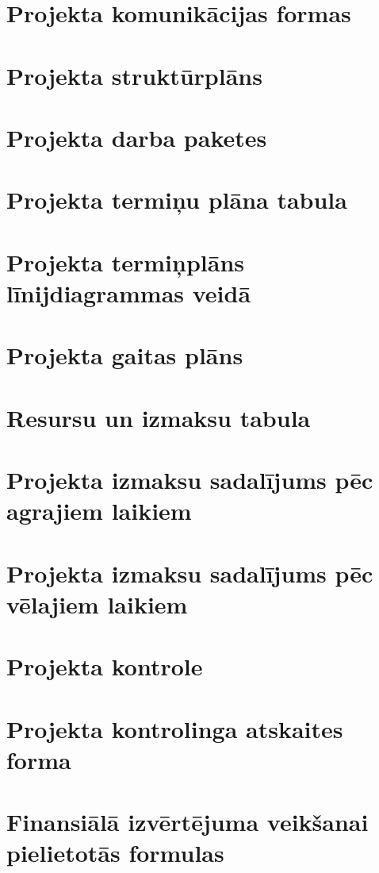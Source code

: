 \section{Projekta komunikācijas formas}
	\label{app:Projekta_komunikacijas_formas}
    \clearpage
\section{Projekta struktūrplāns}
	\label{app:Projekta_strukturplans}
    \clearpage
\section{Projekta darba paketes}
	\label{app:Projekta_darba_paketes}
    \clearpage
\section{Projekta termiņu plāna tabula}
	\label{app:Projekta_terminu_plans}
    \clearpage
\section{Projekta termiņplāns līnijdiagrammas veidā}
	\label{app:Projekta_linijdiagrammas}
    \clearpage
\section{Projekta gaitas plāns}
	\label{app:Projekta_gaitas_plans}
    \clearpage
\section{Resursu un izmaksu tabula}
	\label{app:Projekta_resursu_izmaksu_tabula}
    \clearpage
\section{Projekta izmaksu sadalījums pēc agrajiem laikiem}
	\label{app:Projekta_izmaksu_salidzinajums_agrais}
    \clearpage
\section{Projekta izmaksu sadalījums pēc vēlajiem laikiem}
	\label{app:Projekta_izmaksu_salidzinajums_velais}
    \clearpage
\section{Projekta kontrole}
	\label{app:Projekta_konrole}
    \clearpage
\section{Projekta kontrolinga atskaites forma}
	\label{app:Projekta_atskaitas_forma}
    \clearpage
\section{Finansiālā izvērtējuma veikšanai pielietotās formulas }
	\label{app:Projekta_formulas}
    \clearpage
